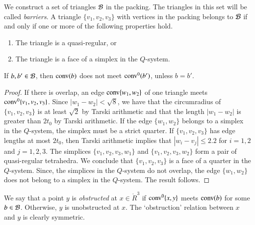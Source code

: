 \begin{definition}\label{def:barrier}
We construct a set of triangles ${\mathcal B}$ in the packing.  The
triangles in this set will be called {\it barriers}.
A triangle $\{v_1,v_2,v_3\}$ with vertices in the packing belongs to
${\mathcal B}$ if and only if  one or more of the following properties
hold.
\begin{enumerate}
    \item The triangle is a
    quasi-regular, or
    \item The triangle is a face of a simplex in the $Q$-system.
\end{enumerate}
\end{definition}

\begin{lemma}\label{lemma:barrier-no-overlap} %
 If $b,b'\in {\mathcal B}$, then
${\operatorname{conv}}(b)$ does not meet ${\operatorname{conv}}^0(b')$, unless $b=b'$.
\end{lemma}

\begin{proof} If there is overlap, an edge ${\operatorname{conv}}\{w_1,w_2\}$ 
of one triangle meets ${\operatorname{conv}}^0\{v_1,v_2,v_3\}$.  Since
$|w_1-w_2|<\sqrt8$,  we have that the circumradius of
$\{v_1,v_2,v_3\}$ is at least $\sqrt2$ by
Tarski arithmetic and that the length $|w_1-w_2|$ is
greater than $2t_0$ by Tarski arithmetic.
If the edge $\{w_1,w_2\}$ belongs to a simplex in the $Q$-system,
the simplex must be a strict quarter.  If $\{v_1,v_2,v_3\}$ has
edge lengths at most $2t_0$, then
Tarski arithmetic implies that $|w_i-v_j|\le2.2$
for $i=1,2$ and $j=1,2,3$.   The simplices $\{v_1,v_2,v_3,w_1\}$
and $\{v_1,v_2,v_3,w_2\}$ form a pair of quasi-regular tetrahedra.
We conclude that $\{v_1,v_2,v_3\}$ is a face of a quarter in the
$Q$-system. Since, the simplices in the $Q$-system do not overlap,
the edge $\{w_1,w_2\}$ does not belong to a simplex in the
$Q$-system. The result follows.
\end{proof}



\begin{definition}[obstructed] \label{def:obstructed}
We say that a point $y$ is {\it obstructed\/} at $x\in\ring{R}^3$
if ${\operatorname{conv}}^0\{x,y\}$ meets ${\operatorname{conv}}(b)$ for some 
$b\in{\mathcal B}$. Otherwise, $y$ is unobstructed
at $x$.  The `obstruction' relation between $x$ and $y$ is clearly
symmetric.
\end{definition}

